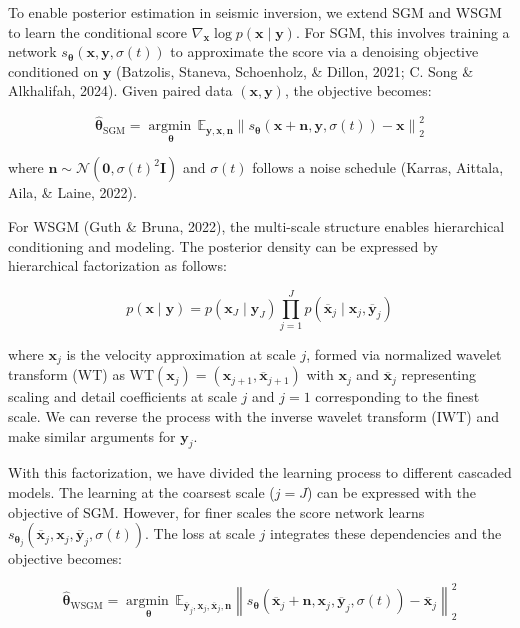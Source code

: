 \documentclass{IMAGE2025}
\begin{document}
To enable posterior estimation in seismic inversion, we extend SGM and
WSGM to learn the conditional score
\(\nabla_{\mathbf{x}} \log p(\mathbf{x} \mid \mathbf{y})\). For SGM,
this involves training a network
\(s_{\boldsymbol{\theta}}(\mathbf{x}, \mathbf{y}, \sigma(t))\) to
approximate the score via a denoising objective conditioned on
\(\mathbf{y}\) (Batzolis, Staneva, Schoenholz, \& Dillon, 2021; C. Song
\& Alkhalifah, 2024). Given paired data \((\mathbf{x}, \mathbf{y})\),
the objective becomes:

\[
\widehat{\boldsymbol{\theta}}_{\text{SGM}} = \mathop{\mathrm{argmin}\,}\limits_{\boldsymbol{\theta}}\mathbb{E}_{\mathbf{y},\mathbf{x}, \mathbf{n}} \left\| s_{\boldsymbol{\theta}}(\mathbf{x} + \mathbf{n}, \mathbf{y}, \sigma(t)) - \mathbf{x} \right\|_2^2
\]

where
\(\mathbf{n} \sim \mathcal{N}(\mathbf{0}, \sigma(t)^2 \mathbf{I})\) and
\(\sigma(t)\) follows a noise schedule (Karras, Aittala, Aila, \& Laine,
2022).

For WSGM (Guth \& Bruna, 2022), the multi-scale structure enables
hierarchical conditioning and modeling. The posterior density can be
expressed by hierarchical factorization as follows:

\[
p(\mathbf{x} \mid \mathbf{y}) = p(\mathbf{x}_J \mid \mathbf{y}_J) \prod_{j = 1}^{J} p(\overline{\mathbf{x}}_j \mid \mathbf{x}_j, \overline{\mathbf{y}}_j)
\]

where \(\mathbf{x}_j\) is the velocity approximation at scale \(j\),
formed via normalized wavelet transform (WT) as
\(\text{WT}(\mathbf{x}_{j}) = (\mathbf{x}_{j+1}, \overline{\mathbf{x}}_{j+1})\)
with \(\mathbf{x}_j\) and \(\overline{\mathbf{x}}_j\) representing
scaling and detail coefficients at scale \(j\) and \(j=1\) corresponding
to the finest scale. We can reverse the process with the inverse wavelet
transform (IWT) and make similar arguments for \(\mathbf{y}_j\).

With this factorization, we have divided the learning process to
different cascaded models. The learning at the coarsest scale (\(j=J\))
can be expressed with the objective of SGM. However, for finer scales
the score network learns
\(s_{\boldsymbol{\theta}_j}(\overline{\mathbf{x}}_j, \mathbf{x}_j, \overline{\mathbf{y}}_j,\sigma(t))\).
The loss at scale \(j\) integrates these dependencies and the objective
becomes:

\[
\widehat{\boldsymbol{\theta}}_{\text{WSGM}} = \mathop{\mathrm{argmin}\,}\limits_{\boldsymbol{\theta}}\mathbb{E}_{\overline{\mathbf{y}}_j,\mathbf{x}_j,\overline{\mathbf{x}}_j,\mathbf{n}} \left\| s_{\boldsymbol{\theta}}(\overline{\mathbf{x}}_j + \mathbf{n}, \mathbf{x}_j, \overline{\mathbf{y}}_j, \sigma(t)) - \overline{\mathbf{x}}_j \right\|_2^2
\]
\end{document}
